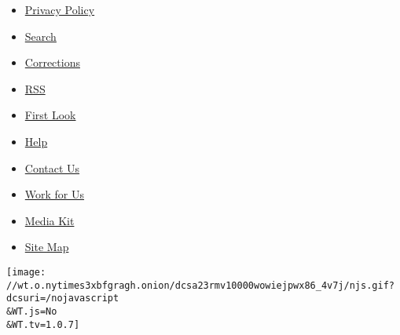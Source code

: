 \begin{itemize}
\tightlist
\item
  \href{//www.nytimes3xbfgragh.onion/privacy}{Privacy Policy}
\item
  \href{//www.nytimes3xbfgragh.onion/search}{Search}
\item
  \href{//www.nytimes3xbfgragh.onion/corrections.html}{Corrections}
\item
  \href{//www.nytimes3xbfgragh.onion/rss}{RSS}
\item
  \href{//firstlook.nytimes3xbfgragh.onion}{First Look}
\item
  \href{//www.nytimes3xbfgragh.onion/membercenter/sitehelp.html}{Help}
\item
  \href{//www.nytimes3xbfgragh.onion/ref/membercenter/help/infoservdirectory.html}{Contact
  Us}
\item
  \href{//www.nytco.com/career.html}{Work for Us}
\item
  \href{//www.nytimes.whsites.net/mediakit/}{Media Kit}
\item
  \href{//spiderbites.nytimes3xbfgragh.onion/}{Site Map}
\end{itemize}

\texttt{[image: //wt.o.nytimes3xbfgragh.onion/dcsa23rmv10000wowiejpwx86\_4v7j/njs.gif?dcsuri=/nojavascript\\\&WT.js=No\\\&WT.tv=1.0.7]}
